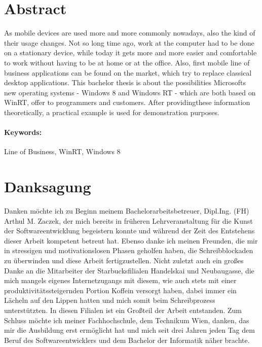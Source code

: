 \documentclass[a4paper,bibtotoc,oneside]{scrbook}
\begin{document}
\section*{Abstract}\thispagestyle{empty}
As mobile devices are used more and more commonly nowadays, also the kind of their usage changes. Not so long time ago, work at the computer had to be done on a stationary device, while today it gets more and more easier and comfortable to work without having to be at home or at the office.
\newline
Also, first mobile line of business applications can be found on the market, which try to replace classical desktop applications.
\newline
This bachelor thesis is about the possibilities Microsofts new operating systems - Windows 8 and Windows RT - which are both based on WinRT, offer to programmers and customers. After providingthese information theoretically, a practical example is used for demonstration purposes.
\\ \vfill
\paragraph*{Keywords:} Line of Business, WinRT, Windows 8
\newpage

\section*{Danksagung}
\thispagestyle{empty}
Danken möchte ich zu Beginn meinem Bachelorarbeitsbetreuer, Dipl.Ing. (FH) Arthul M. Zaczek, der mich bereits in früheren Lehrveranstaltung für die Kunst der Softwareentwicklung begeistern konnte und während der Zeit des Entstehens dieser Arbeit kompetent betreut hat.
\newline
\newline
Ebenso danke ich meinen Freunden, die mir in stressigen und motivationslosen Phasen geholfen haben, die Schreibblockaden zu überwinden und diese Arbeit fertigzustellen.
\newline
\newline
Nicht zuletzt auch ein großes Danke an die Mitarbeiter der Starbucksfilialen Handelskai und Neubaugasse, die mich mangels eigenes Internetzugangs mit diesem, wie auch stets mit einer produktivitätssteigernden Portion Koffein versorgt haben, dabei immer ein Lächeln auf den Lippen hatten und mich somit beim Schreibprozess unterstützten. In diesen Filialen ist ein Großteil der Arbeit entstanden.
\newline
\newline
Zum Schluss möchte ich meiner Fachhochschule, dem Technikum Wien, danken, das mir die Ausbildung erst ermöglicht hat und mich seit drei Jahren jeden Tag dem Beruf des Softwareentwicklers und dem Bachelor der Informatik näher brachte.
\end{document}
